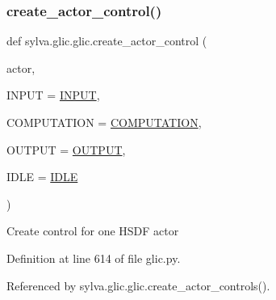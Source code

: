 \subsubsection{\texorpdfstring{create\+\_\+actor\+\_\+control()}{create\_actor\_control()}}
{\footnotesize\ttfamily def sylva.\+glic.\+glic.\+create\+\_\+actor\+\_\+control (\begin{DoxyParamCaption}\item[{}]{actor,  }\item[{}]{I\+N\+P\+UT = {\ttfamily \hyperlink{namespacesylva_1_1glic_1_1glic_ab7e66a35c60e9c2fbeb69191240a7dc9}{I\+N\+P\+UT}},  }\item[{}]{C\+O\+M\+P\+U\+T\+A\+T\+I\+ON = {\ttfamily \hyperlink{namespacesylva_1_1glic_1_1glic_a7ed9d88425bdb7584d63853dc31381f2}{C\+O\+M\+P\+U\+T\+A\+T\+I\+ON}},  }\item[{}]{O\+U\+T\+P\+UT = {\ttfamily \hyperlink{namespacesylva_1_1glic_1_1glic_ad6e11d2ff626d576dddd38f99952a31a}{O\+U\+T\+P\+UT}},  }\item[{}]{I\+D\+LE = {\ttfamily \hyperlink{namespacesylva_1_1glic_1_1glic_ada3197b7ecf6f2b781f0f358b482a2b4}{I\+D\+LE}} }\end{DoxyParamCaption})}

\begin{DoxyVerb}Create control for one HSDF actor \end{DoxyVerb}
 

Definition at line 614 of file glic.\+py.



Referenced by sylva.\+glic.\+glic.\+create\+\_\+actor\+\_\+controls().



